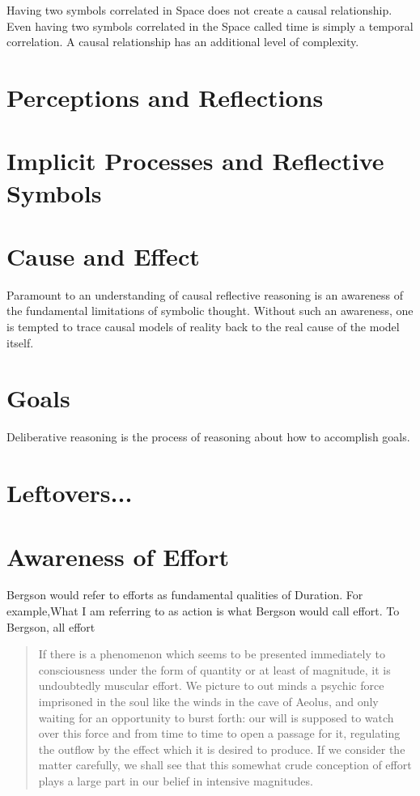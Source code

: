 Having two symbols correlated in Space does not create a causal
relationship.  Even having two symbols correlated in the Space called
time is simply a temporal correlation.  A causal relationship has an
additional level of complexity.



\section{Perceptions and Reflections}



\section{Implicit Processes and Reflective Symbols}



\section{Cause and Effect}

Paramount to an understanding of causal reflective reasoning is an
awareness of the fundamental limitations of symbolic thought.  Without
such an awareness, one is tempted to trace causal models of reality
back to the real cause of the model itself.  

\section{Goals}

Deliberative reasoning is the process of reasoning about how to
accomplish goals.  



\section{Leftovers...}

\section{Awareness of Effort}

Bergson would refer to efforts as fundamental qualities of Duration.
For example,What I am referring to as action is what Bergson would
call effort.  To Bergson, all effort

\begin{quote}
If there is a phenomenon which seems to be presented immediately to
consciousness under the form of quantity or at least of magnitude, it
is undoubtedly muscular effort.  We picture to out minds a psychic
force imprisoned in the soul like the winds in the cave of Aeolus, and
only waiting for an opportunity to burst forth: our will is supposed
to watch over this force and from time to time to open a passage for
it, regulating the outflow by the effect which it is desired to
produce.  If we consider the matter carefully, we shall see that this
somewhat crude conception of effort plays a large part in our belief
in intensive magnitudes.
\end{quote}

